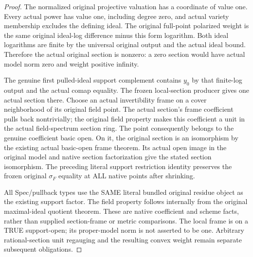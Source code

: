 \begin{proof}
The normalized original projective valuation has a coordinate of value one.
Every actual power has value one, including degree zero, and actual variety
membership excludes the defining ideal. The original full-point polarized
weight is the same original ideal-log difference minus this form logarithm.
Both ideal logarithms are finite by the universal original output and the
actual ideal bound. Therefore the actual original section is nonzero: a zero
section would have actual model norm zero and weight positive infinity.

The genuine first pulled-ideal support complement contains $y_0$ by that
finite-log output and the actual comap equality. The frozen local-section
producer gives one actual section there. Choose an actual invertibility
frame on a cover neighborhood of its original field point. The actual
section's frame coefficient pulls back nontrivially; the original field
property makes this coefficient a unit in the actual field-spectrum
section ring. The point consequently belongs to the genuine coefficient
basic open. On it, the original section is an isomorphism by the existing
actual basic-open frame theorem. Its actual open image in the original
model and native section factorization give the stated section isomorphism.
The preceding literal support restriction identity preserves the frozen
original $\sigma_F$ equality at ALL native points after shrinking.

All Spec/pullback types use the SAME literal bundled original residue object
as the existing support factor. The field property follows internally from
the original maximal-ideal quotient theorem. These are native coefficient
and scheme facts, rather than supplied section-frame or metric comparisons.
The local frame is on a TRUE support-open; its proper-model norm is not
asserted to be one. Arbitrary rational-section unit regauging and the
resulting convex weight remain separate subsequent obligations.
\end{proof}
